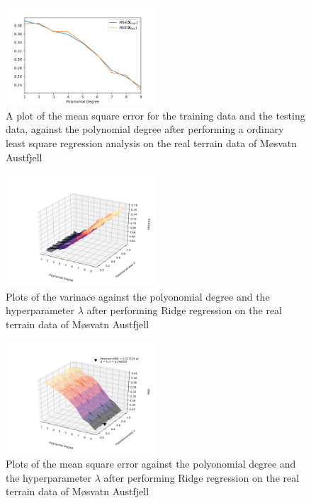 \documentclass[a4paper,10pt,english]{article}
\begin{document}
\begin{figure}[H]
	\centering 
	\includegraphics[width = 0.5\textwidth, center]{../real_output/part_C_2.png}
	\caption{
		A plot of the mean square error for the training data and the testing data, against the polynomial degree after performing a ordinary least square regression analysis on the real terrain data of Møsvatn Austfjell
	}
	\label{part_g_c2}
\end{figure}



\begin{figure}[H]
	\centering 
	\includegraphics[width = 0.5\textwidth, center]{../real_output/part_D_1.png}
	\caption{
		Plots of the varinace against the polyonomial degree and the hyperparameter $\lambda$ after performing Ridge regression on the real terrain data of Møsvatn Austfjell
	}
	\label{part_g_d1}
\end{figure}

\begin{figure}[H]
	\centering 
	\includegraphics[width = 0.5\textwidth, center]{../real_output/part_D_2.png}
	\caption{
		Plots of the mean square error against the polyonomial degree and the hyperparameter $\lambda$ after performing Ridge regression on the real terrain data of Møsvatn Austfjell 
	}
	\label{part_g_d2}
\end{figure}
\end{document}
